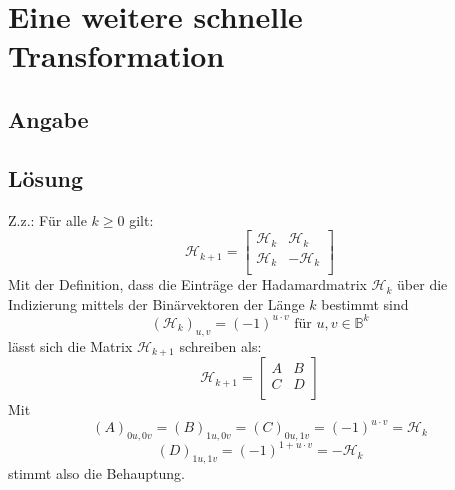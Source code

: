 \section*{Eine weitere schnelle Transformation}
\subsection*{Angabe}


\subsection*{Lösung}
\renewcommand{\H}{\mathcal{H}}
\begin{flushenum}
	\item Z.z.: Für alle $k \geq 0$ gilt:
	\[ \H_{k+1} = \begin{bmatrix}
		\H_k & \H_k \\
		\H_k & -\H_k \\
	\end{bmatrix} \]
	Mit der Definition, dass die Einträge der Hadamardmatrix $\H_k$ über die Indizierung
	mittels der Binärvektoren der Länge $k$ bestimmt sind
	\[ \left( \H_k \right)_{u,v} = (-1)^{u \cdot v} \text{ für } u,v \in \mathds{B}^k \]
	lässt sich die Matrix $\H_{k+1}$ schreiben als:
	\[ \H_{k+1} = \begin{bmatrix}
		A & B \\
		C & D \\
	\end{bmatrix} \]
	Mit
	\[ \left( A \right)_{0u,0v} = \left( B\right)_{1u, 0v} = \left( C \right)_{0u, 1v} = (-1)^{u \cdot v} = \H_k \]
	\[ \left( D \right)_{1u, 1v} = (-1)^{1 + u \cdot v} = - \H_k \]
	stimmt also die Behauptung.


\end{flushenum}
